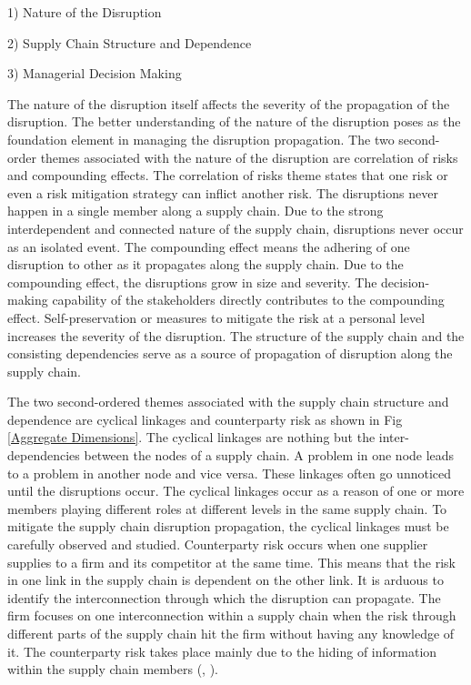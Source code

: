 1) Nature of the Disruption

2) Supply Chain Structure and Dependence 

3) Managerial Decision Making

The nature of the disruption itself affects the severity of the propagation of the disruption. The better understanding of the nature of the disruption poses as the foundation element in managing the disruption propagation. The two second-order themes associated with the nature of the disruption are correlation of risks and compounding effects. The correlation of risks theme states that one risk or even a risk mitigation strategy can inflict another risk. The disruptions never happen in a single member along a supply chain. Due to the strong interdependent and connected nature of the supply chain, disruptions never occur as an isolated event. The compounding effect means the adhering of one disruption to other as it propagates along the supply chain. Due to the compounding effect, the disruptions grow in size and severity. The decision-making capability of the stakeholders directly contributes to the compounding effect. Self-preservation or measures to mitigate the risk at a personal level increases the severity of the disruption. The structure of the supply chain and the consisting dependencies serve as a source of propagation of disruption along the supply chain.

The two second-ordered themes associated with the supply chain structure and dependence are cyclical linkages and counterparty risk as shown in Fig \ref{Aggregate Dimensions}. The cyclical linkages are nothing but the inter-dependencies between the nodes of a supply chain. A problem in one node leads to a problem in another node and vice versa. These linkages often go unnoticed until the disruptions occur. The cyclical linkages occur as a reason of one or more members playing different roles at different levels in the same supply chain. To mitigate the supply chain disruption propagation, the cyclical linkages must be carefully observed and studied. Counterparty risk occurs when one supplier supplies to a firm and its competitor at the same time. This means that the risk in one link in the supply chain is dependent on the other link. It is arduous to identify the interconnection through which the disruption can propagate. The firm focuses on one interconnection within a supply chain when the risk through different parts of the supply chain hit the firm without having any knowledge of it. The counterparty risk takes place mainly due to the hiding of information within the supply chain members (\citeauthor{Scheibe2017}, \citeyear{Scheibe2017}). 


